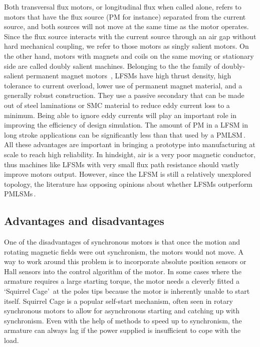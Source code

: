         
        Both transversal flux motors, or longitudinal flux when called alone, refers to motors that have the flux source (\acs{PM} for instance) separated from the current source, and both sources will not move at the same time as the motor operates. Since the flux source interacts with the current source through an air gap without hard mechanical coupling, we refer to those motors as singly salient motors. On the other hand, motors with magnets and coils on the same moving or stationary side are called doubly salient machines. Belonging  to  the  the  family of doubly-salient permanent magnet motors \,\cite{Cheng2011}, \acp{LFSM} have high  thrust  density, high  tolerance  to  current  overload, lower use  of  permanent  magnet  material,  and  a generally robust construction. They use a passive secondary that can be made out of steel laminations or \ac{SMC} material to reduce eddy current loss to a minimum. Being  able  to ignore eddy currents will play an important role in improving the efficiency of design simulation. The amount of \acs{PM} in a \acs{LFSM} in long stroke applications can be significantly less than that used by a \acs{PMLSM}\,\cite{Aleksandrov2018DesignTracks}. All these advantages are important in bringing a  prototype into manufacturing at scale to reach high reliability. In hindsight, air is a very poor magnetic conductor, thus machines like \acsp{LFSM} with very small flux path resistance should vastly improve motors output. However, since the \acs{LFSM} is still a relatively unexplored topology, the literature has opposing opinions about whether \acsp{LFSM} outperform \acsp{PMLSM}\,\cite{Aleksandrov2018DesignTracks,Wang2008ComparativeSuspension}.
    
    
    \subsection{Advantages and disadvantages}   \label{Chapter:background/linear synchronous motors for NFJI/advantages and disadvantages}
        
        
        One of the disadvantages of synchronous motors is that once the motion and rotating magnetic fields were out synchronism, the motors would not move. A way to work around this problem is to incorporate absolute position sensors or Hall sensors into the control algorithm of the motor. In some cases where the armature requires a large starting torque, the motor needs a cleverly fitted a ‘Squirrel Cage’\,\cite{Marcic2008} at the poles tips because the motor is inherently unable to start itself. Squirrel Cage is a popular self-start mechanism, often seen in rotary synchronous motors to allow for asynchronous starting and catching up with synchronism. Even with the help of methods to speed up to synchronism, the armature can always lag if the power supplied is insufficient to cope with the load.
        
